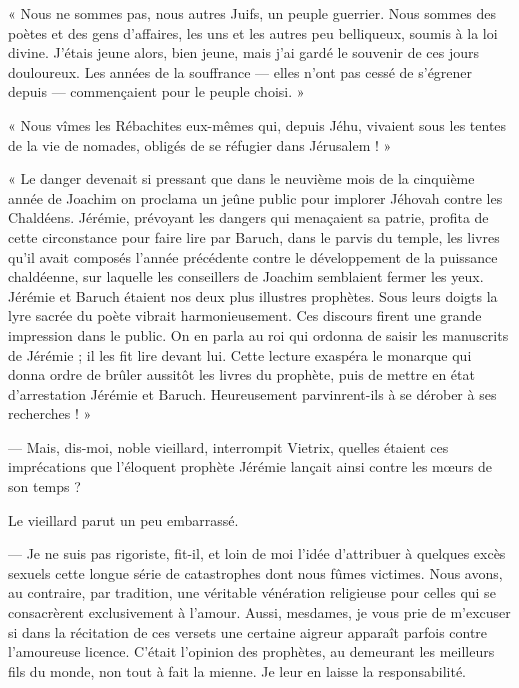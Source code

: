 \documentclass[a4paper, 11pt, oneside, polutonikogreek, french]{article}
\begin{document}
\bigskip
\centerline{\EightStarTaper}
\centerline{\EightStarTaper\EightStarTaper}
\bigskip

« Nous ne sommes pas, nous autres Juifs, un peuple guerrier. Nous sommes des poètes et des gens d'affaires, les uns et les autres peu belliqueux, soumis à la loi divine. J'étais jeune alors, bien jeune, mais j'ai gardé le souvenir de ces jours douloureux. Les années de la souffrance --- elles n'ont pas cessé de s'égrener depuis --- commençaient pour le peuple choisi. »

« Nous vîmes les Rébachites eux-mêmes qui, depuis Jéhu, vivaient sous les tentes de la vie de nomades, obligés de se réfugier dans Jérusalem ! »

« Le danger devenait si pressant que dans le neuvième mois de la cinquième année de Joachim on proclama un jeûne public pour implorer Jéhovah contre les Chaldéens. Jérémie, prévoyant les dangers qui menaçaient sa patrie, profita de cette circonstance pour faire lire par Baruch, dans le parvis du temple, les livres qu'il avait composés l'année précédente contre le développement de la puissance chaldéenne, sur laquelle les conseillers de Joachim semblaient fermer les yeux. Jérémie et Baruch étaient nos deux plus illustres prophètes. Sous leurs doigts la lyre sacrée du poète vibrait harmonieusement. Ces discours firent une grande impression dans le public. On en parla au roi qui ordonna de saisir les manuscrits de Jérémie ; il les fit lire devant lui. Cette lecture exaspéra le monarque qui donna ordre de brûler aussitôt les livres du prophète, puis de mettre en état d'arrestation Jérémie et Baruch. Heureusement parvinrent-ils à se dérober à ses recherches ! »

\bigskip
\centerline{\EightStarTaper}
\centerline{\EightStarTaper\EightStarTaper}
\bigskip

--- Mais, dis-moi, noble vieillard, interrompit Vietrix, quelles étaient ces imprécations que l'éloquent prophète Jérémie lançait ainsi contre les mœurs de son temps ?

Le vieillard parut un peu embarrassé.

--- Je ne suis pas rigoriste, fit-il, et loin de moi l'idée d'attribuer à quelques excès sexuels cette longue série de catastrophes dont nous fûmes victimes. Nous avons, au contraire, par tradition, une véritable vénération religieuse pour celles qui se consacrèrent exclusivement à l'amour. Aussi, mesdames, je vous prie de m'excuser si dans la récitation de ces versets une certaine aigreur apparaît parfois contre l'amoureuse licence. C'était l'opinion des prophètes, au demeurant les meilleurs fils du monde, non tout à fait la mienne. Je leur en laisse la responsabilité.
\end{document}
